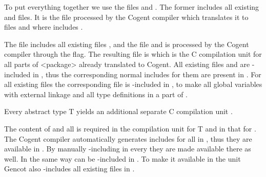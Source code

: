 To put everything together we use the files  and . The former includes all 
existing  and  files.
It is the file processed by the Cogent compiler which translates it to files  
and  where  includes . 

The file  includes all existing files 
,  and the file  and is processed by the Cogent compiler through the 
 flag. The resulting file is  which is the C compilation unit for 
all parts of <package> already translated to Cogent. All existing files  and  are 
-included in , thus the corresponding normal includes for them are present in 
.
For all existing files  the corresponding file  is -included in 
, to make all global variables with external linkage and all type definitions in  
a part of .

Every abstract type T yields an additional separate C compilation unit . 

The content of  and all  is required in the compilation unit for T and in 
that for . The Cogent compiler automatically generates includes for all  in 
, 
thus they are available in . By manually -including  in every 
 they are made available there as well. In the same way  can be -included
in . To make it available in the  unit Gencot also -includes all 
existing  files in .

 
